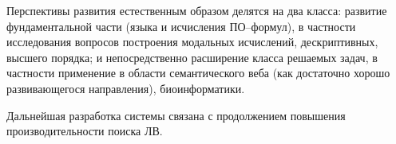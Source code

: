 

Перспективы развития естественным образом делятся на два класса: развитие фундаментальной части (языка и исчисления ПО--формул), в частности исследования вопросов построения модальных исчислений, дескриптивных, высшего порядка; и непосредственно расширение класса решаемых задач, в частности применение в области семантического веба (как достаточно хорошо развивающегося направления), биоинформатики.

Дальнейшая разработка системы связана с продолжением повышения производительности поиска ЛВ.


